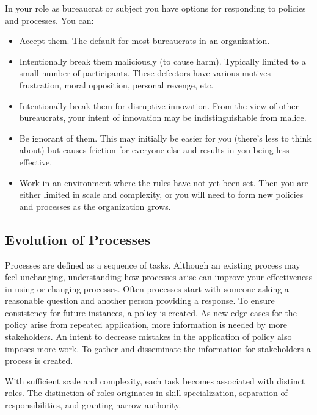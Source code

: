 In your role as bureaucrat or subject you have options for responding to policies and processes. You can:
\begin{itemize}
    \item Accept them. The default for most bureaucrats in an  organization.
    \item Intentionally break them maliciously (to cause harm). Typically limited to a small number of participants. These defectors have various motives -- frustration, moral opposition, personal revenge, etc.
    \item Intentionally break them for disruptive innovation. 
    From the view of other bureaucrats, your intent of innovation may be indistinguishable from malice. 
    \item Be ignorant of them. This may initially be easier for you (there's less to think about) but causes friction for everyone else and results in you being less effective. 
    \item Work in an environment where the rules have not yet been set. Then you are either limited in scale and complexity, or you will need to form new policies and processes as the organization grows.
\end{itemize}


\subsection*{Evolution of Processes}
Processes are defined as a sequence of tasks. Although an existing process may feel unchanging, understanding how processes arise can improve your effectiveness in using or changing processes. Often processes start with someone asking a reasonable question and another person providing a response. To ensure consistency for future instances, a policy is created. As new edge cases for the policy arise from repeated application, more information is needed by more stakeholders. An intent to decrease mistakes in the application of policy also imposes more work. To gather and disseminate the information for stakeholders a process is created. 

With sufficient scale and complexity, each task becomes associated with distinct roles. The distinction of roles originates in skill specialization, separation of responsibilities, and granting narrow authority. 

